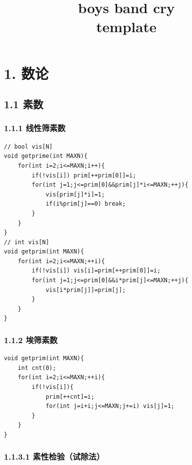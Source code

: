 \documentclass[UTF8,a4paper,11pt]{ctexart}
\title{boys band cry\\\large template}
\author{}
\date{}
\begin{document}
\maketitle
\thispagestyle{fancy}
\renewcommand{\contentsname}{目录}
\setcounter{tocdepth}{3}
\tableofcontents
\clearpage
\section*{1. 数论}

\subsection*{1.1 素数}

\subsubsection*{1.1.1 线性筛素数}

\begin{Verbatim}[fontsize=\small,frame=single,breaklines=true,breakanywhere=true]
// bool vis[N]
void getprime(int MAXN){
    for(int i=2;i<=MAXN;i++){
        if(!vis[i]) prim[++prim[0]]=i;
        for(int j=1;j<=prim[0]&&prim[j]*i<=MAXN;++j){
            vis[prim[j]*i]=1;
            if(i%prim[j]==0) break;
        }
    }
}
// int vis[N]
void getprim(int MAXN){
    for(int i=2;i<=MAXN;++i){
        if(!vis[i]) vis[i]=prim[++prim[0]]=i;
        for(int j=1;j<=prim[0]&&i*prim[j]<=MAXN;++j){
            vis[i*prim[j]]=prim[j];
        }
    }
}
\end{Verbatim}
\subsubsection*{1.1.2 埃筛素数}

\begin{Verbatim}[fontsize=\small,frame=single,breaklines=true,breakanywhere=true]
void getprim(int MAXN){
    int cnt(0);
    for(int i=2;i<=MAXN;++i){
        if(!vis[i]){
            prim[++cnt]=i;
            for(int j=i+i;j<=MAXN;j+=i) vis[j]=1;
        }
    }
}
\end{Verbatim}

\subsubsection*{1.1.3.1 素性检验（试除法）}
\end{document}
